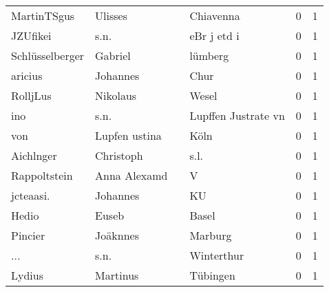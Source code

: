 \documentclass[10pt,a4paper,landscape]{article}
\begin{document}
\begin{longtable}{llllrr}
              MartinTSgus &                            Ulisses &             &                                   Chiavenna &          0 &         1 \\
                 JZUfikei &                               s.n. &             &                                 eBr j etd i &          0 &         1 \\
          Schlüsselberger &                            Gabriel &             &                                     lümberg &          0 &         1 \\
                  aricius &                           Johannes &             &                                        Chur &          0 &         1 \\
                 RolljLus &                           Nikolaus &             &                                       Wesel &          0 &         1 \\
                      ino &                               s.n. &             &                         Lupffen Justrate vn &          0 &         1 \\
                      von &                      Lupfen ustina &             &                                        Köln &          0 &         1 \\
                Aichlnger &                          Christoph &             &                                        s.l. &          0 &         1 \\
             Rappoltstein &                       Anna Alexamd &             &                                           V &          0 &         1 \\
                jcteaasi. &                           Johannes &             &                                          KU &          0 &         1 \\
                    Hedio &                              Euseb &             &                                       Basel &          0 &         1 \\
                  Pincier &                           Joäknnes &             &                                     Marburg &          0 &         1 \\
                      ... &                               s.n. &             &                                  Winterthur &          0 &         1 \\
                   Lydius &                           Martinus &             &                                    Tübingen &          0 &         1 \\

\end{longtable}
\end{document}
